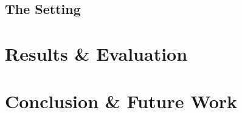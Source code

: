 \documentclass[sigconf,authordraft]{acmart}
\begin{document}
\subsection{The Setting}











\section{Results \& Evaluation}

\section{Conclusion \& Future Work}

\begin{acks}

\end{acks}




\appendix
\end{document}
